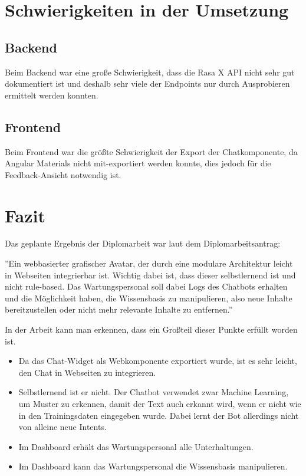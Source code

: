 \section{Schwierigkeiten in der Umsetzung}

\subsection{Backend}
Beim Backend war eine große Schwierigkeit, dass die Rasa X API nicht sehr gut dokumentiert ist und deshalb sehr viele der Endpoints nur durch Ausprobieren ermittelt werden konnten.


\subsection{Frontend}
Beim Frontend war die größte Schwierigkeit der Export der Chatkomponente, da Angular Materials nicht mit-exportiert werden konnte, dies jedoch für die Feedback-Ansicht notwendig ist.

\section{Fazit}
Das geplante Ergebnis der Diplomarbeit war laut dem Diplomarbeitsantrag:

''Ein webbasierter grafischer Avatar, der durch eine modulare Architektur leicht in Webseiten integrierbar ist.
Wichtig dabei ist, dass dieser selbstlernend ist und nicht rule-based.
Das Wartungspersonal soll dabei Logs des Chatbots erhalten und die Möglichkeit haben, die Wissensbasis zu manipulieren, also neue Inhalte bereitzustellen oder nicht mehr relevante Inhalte zu entfernen.''

In der Arbeit kann man erkennen, dass ein Großteil dieser Punkte erfüllt worden ist.

\begin{itemize}
    \item Da das Chat-Widget als Webkomponente exportiert wurde, ist es sehr leicht, den Chat in Webseiten zu integrieren.
    \item Selbstlernend ist er nicht.
    Der Chatbot verwendet zwar Machine Learning, um Muster zu erkennen, damit der Text auch erkannt wird, wenn er nicht wie in den Trainingsdaten eingegeben wurde.
    Dabei lernt der Bot allerdings nicht von alleine neue Intents.
    \item Im Dashboard erhält das Wartungspersonal alle Unterhaltungen.
    \item Im Dashboard kann das Wartungspersonal die Wissensbasis manipulieren.
\end{itemize}

